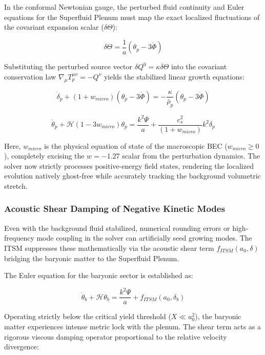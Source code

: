 \documentclass[aps,prd,10pt,twocolumn,superscriptaddress,nofootinbib,floatfix]{revtex4-2}
\begin{document}
In the conformal Newtonian gauge, the perturbed fluid continuity and Euler equations for the Superfluid Plenum must map the exact localized fluctuations of the covariant expansion scalar ($\delta\Theta$):

\begin{equation}
\delta\Theta = \frac{1}{a} \left( \theta_p - 3\dot{\Phi} \right)
\end{equation}

Substituting the perturbed source vector $\delta Q^0 = \kappa \delta\Theta$ into the covariant conservation law $\nabla_\mu T_p^{\mu\nu} = -Q^\nu$ yields the stabilized linear growth equations:

\begin{equation}
\dot{\delta}_p + (1+w_{micro}) \left( \theta_p - 3\dot{\Phi} \right) = - \frac{\kappa}{\bar{\rho}_p} (\theta_p - 3\dot{\Phi})
\end{equation}

\begin{equation}
\dot{\theta}_p + \mathcal{H}(1 - 3w_{micro})\theta_p = \frac{k^2 \Psi}{a} + \frac{c_s^2}{(1+w_{micro})} k^2 \delta_p
\end{equation}

Here, $w_{micro}$ is the physical equation of state of the macroscopic BEC ($w_{micro} \ge 0$), completely excising the $w = -1.27$ scalar from the perturbation dynamics. The solver now strictly processes positive-energy field states, rendering the localized evolution natively ghost-free while accurately tracking the background volumetric stretch.

\subsubsection{Acoustic Shear Damping of Negative Kinetic Modes}

Even with the background fluid stabilized, numerical rounding errors or high-frequency mode coupling in the solver can artificially seed growing modes. The ITSM suppresses these mathematically via the acoustic shear term $f_{ITSM}(a_0, \delta)$ bridging the baryonic matter to the Superfluid Plenum.

The Euler equation for the baryonic sector is established as:

\begin{equation}
\dot{\theta}_b + \mathcal{H}\theta_b = \frac{k^2\Psi}{a} + f_{ITSM}(a_0, \delta_b)
\end{equation}

Operating strictly below the critical yield threshold ($X \ll a_0^2$), the baryonic matter experiences intense metric lock with the plenum. The shear term acts as a rigorous viscous damping operator proportional to the relative velocity divergence:
\end{document}
